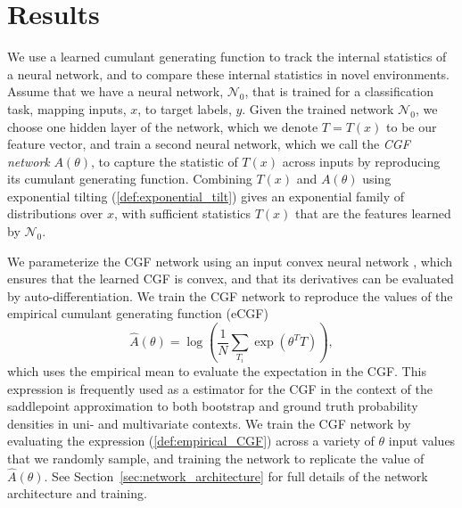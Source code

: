\documentclass[11pt]{article}      %
\begin{document}
\section{Results}

We use a learned cumulant generating function to track the internal statistics of a neural network, and to compare these internal statistics in novel environments.
Assume that we have a neural network, $\mathcal{N}_0$, that is trained for a classification task, mapping inputs, $x$, to target labels, $y$.
Given the trained network $\mathcal{N}_0$, we choose one hidden layer of the network, which we denote $T=T(x)$ to be our feature vector, and train a second neural network, which we call the \textit{CGF network} $A(\theta)$, to capture the statistic of $T(x)$ across inputs by reproducing its cumulant generating function. 
Combining $T(x)$ and $A(\theta)$ using exponential tilting (\ref{def:exponential_tilt}) gives an exponential family of distributions over $x$, with sufficient statistics $T(x)$ that are the features learned by $\mathcal{N}_0$.

We parameterize the CGF network using an input convex neural network \cite{amos_input_2017,hoedt_principled_2023}, which ensures that the learned CGF is convex, and that its derivatives can be evaluated by auto-differentiation.
We train the CGF network to reproduce the values of the empirical cumulant generating function (eCGF)
\begin{equation}
  \hat A(\theta) = \log \left( \frac{1}{N}\sum_{T_i} \exp(\theta^T T) \right), \label{def:empirical_CGF}
\end{equation}
which uses the empirical mean to evaluate the expectation in the CGF. 
This expression is frequently used as a estimator for the CGF in the context of the saddlepoint approximation to both bootstrap \cite{davison_saddlepoint_1988} and ground truth \cite{ronchetti_empirical_1994} probability densities in uni- and multivariate contexts. 
We train the CGF network by evaluating the expression (\ref{def:empirical_CGF}) across a variety of $\theta$ input values that we randomly sample, and training the network to replicate the value of $\hat A(\theta)$.
See Section~\ref{sec:network_architecture} for full details of the network architecture and training.
\end{document}
